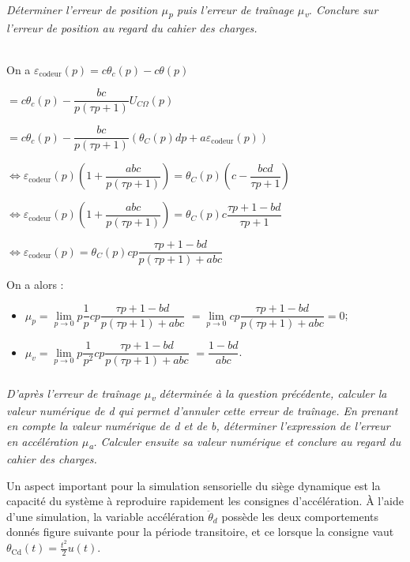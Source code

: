\documentclass[10pt,fleqn]{article} %
\begin{document}
\begin{multicols}{2}
\subparagraph{\label{q13}}\textit{Déterminer l'erreur de position $\mu$\emph{\textsubscript{p}} puis
  l'erreur de traînage $\mu$\emph{\textsubscript{v}}. Conclure sur l'erreur
  de position au regard du cahier des charges.}
\ifprof
\begin{corrige} ~\\

On a 
$\varepsilon_{\text{codeur}}(p)=c\theta_c(p)-c\theta(p)$ 

$=c\theta_c(p)-\dfrac{bc}{p\left(\tau p + 1 \right)}U_{C \Omega }(p)$

 $=c\theta_c(p)-\dfrac{bc}{p\left(\tau p + 1 \right)}\left( \theta_C(p) dp + a \varepsilon_{\text{codeur}}(p) \right)$

$\Leftrightarrow \varepsilon_{\text{codeur}}(p)\left(1+\dfrac{abc}{p\left(\tau p + 1 \right)}\right) = \theta_C(p)  \left(c-\dfrac{bcd}{\tau p + 1 } \right)$

$\Leftrightarrow \varepsilon_{\text{codeur}}(p)\left(1+\dfrac{abc}{p\left(\tau p + 1 \right)}\right) = \theta_C(p)  c \dfrac{\tau p + 1 -bd}{\tau p + 1 } $

$\Leftrightarrow \varepsilon_{\text{codeur}}(p) = \theta_C(p)  cp \dfrac{\tau p + 1 -bd}{p\left(\tau p + 1 \right)+abc} $

On a alors : 
\begin{itemize}
\item $\mu_p=\lim\limits_{p\to0}  p\dfrac{1}{p}  cp \dfrac{\tau p + 1 -bd}{p\left(\tau p + 1 \right)+abc}$ $=\lim\limits_{p\to0}  cp \dfrac{\tau p + 1 -bd}{p\left(\tau p + 1 \right)+abc}=0$;
\item $\mu_v=\lim\limits_{p\to0}  p\dfrac{1}{p^2}  cp \dfrac{\tau p + 1 -bd}{p\left(\tau p + 1 \right)+abc}$ 
$= \dfrac{1 -bd}{abc}$.
\end{itemize}

\end{corrige}
\else
\fi
  
\subparagraph{\label{q14}}\textit{D'après l'erreur de traînage $\mu$\emph{\textsubscript{v}} déterminée à
  la question précédente, calculer la valeur numérique de d qui permet
  d'annuler cette erreur de traînage. En prenant en compte la valeur
  numérique de d et de b, déterminer l'expression de l'erreur en
  accélération $\mu$\emph{\textsubscript{a}}. Calculer ensuite sa valeur
  numérique et conclure au regard du cahier des charges.}
\ifprof
\begin{corrige}
\end{corrige}
\else
\fi

Un aspect important pour la simulation sensorielle du siège dynamique
est la capacité du système à reproduire rapidement les consignes
d'accélération. À l'aide d'une simulation, la variable accélération
\({\ddot{\theta}}_{d}\) possède les deux comportements donnés figure suivante
pour la période transitoire, et ce lorsque la consigne vaut
\(\theta_{\text{Cd}}\left( t \right) = \frac{t^{2}}{2}u(t)\).



\end{multicols}
\end{document}
